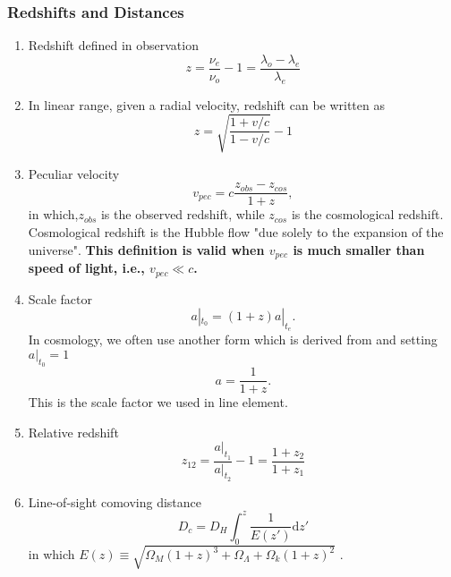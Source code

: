 \subsubsection{Redshifts and Distances}

\begin{enumerate}
\item
Redshift defined in observation
\begin{equation}
	z = \frac{\nu_e}{\nu_o} -1 = \frac{\lambda_o-\lambda_e}{\lambda_e}
\end{equation}

\item
In linear range, given a radial velocity, redshift can be written as
\begin{equation}
	z = \sqrt{\frac{1 + v/c}{1 - v/c}} - 1
\end{equation}

\item
Peculiar velocity
\begin{equation}
	v_{pec} = c \frac {z_{obs} - z_{cos} }{ 1+z }  ,
\end{equation}
in which,$z_{obs}$ is the observed redshift, while $z_{cos}$ is the cosmological redshift. Cosmological redshift is the Hubble flow "due solely to the expansion of the universe".
{\bf This definition is valid when $v_{pec}$ is much smaller than speed of light, i.e., $v_{pec}\ll c$.}

\item
Scale factor
\begin{equation}
	a|_{t_0} = (1+z) a|_{t_e}  \label{eq-co-dis-scale_factor}  .
\end{equation}
In cosmology, we often use another form which is derived from \label{eq-co-dis-scale_factor} and setting $a|_{t_0}= 1$
\begin{equation}
	a = \frac 1{1+z}     .
\end{equation}
This is the scale factor we used in line element.

\item
Relative redshift
\begin{equation}
	z_{12} = \frac{a|_{t_1}}{a|_{t_2}}-1 = \frac{1+z_2}{1+z_1}
\end{equation}

\item
Line-of-sight comoving distance
\begin{equation}
	D_c = D_H\int^z_0 \frac{1}{E(z')}\mathrm dz'
\end{equation}
in which $E(z) \equiv \sqrt{\Omega_M (1+z)^3 + \Omega_\Lambda + \Omega_k (1+z)^2}$    .


\end{enumerate}
